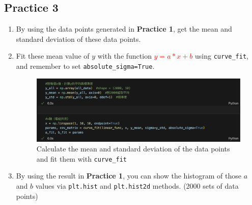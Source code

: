 \documentclass[12pt,a4paper]{article}
\begin{document}
\begin{CJK}{UTF8}{bkai}
\clearpage
\subsection{Practice 3}
\hfill


\begin{enumerate}
    \item By using the data points generated in \textbf{Practice 1}, get the mean and standard deviation of these data points.
    
    \item Fit these mean value of $y$ with the function \textcolor{red}{$y = a \ast x + b$} using \texttt{curve\_fit}, and remember to set \texttt{absolute\_sigma=True}.

    \begin{figure}[h]
        \centering
        \includegraphics[width=1\linewidth]{figures/code/practice_3/code_3_1.png}
        \caption{Calculate the mean and standard deviation of the data points and fit them with \texttt{curve\_fit}}
        \label{fig:code_3_1}
    \end{figure}
    
    \item By using the result in \textbf{Practice 1}, you can show the histogram of those $a$ and $b$ values via \texttt{plt.hist} and \texttt{plt.hist2d} methods. (2000 sets of data points)


\end{enumerate}
\end{CJK}
\end{document}
